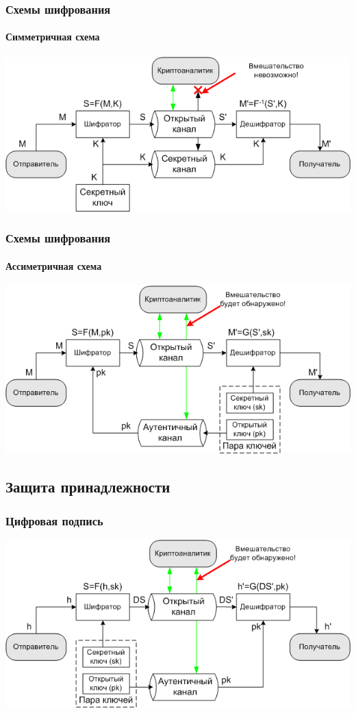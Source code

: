 \begin{frame}
    \frametitle{Схемы шифрования}
    \framesubtitle{Симметричная схема}
    
    \begin{center}
        \includegraphics[width=.95\textwidth]{fig/symmcipher} 
    \end{center}
\end{frame}


\begin{frame}
    \frametitle{Схемы шифрования}
    \framesubtitle{Ассиметричная схема}
    
    \begin{center}
        \includegraphics[width=.95\textwidth]{fig/asymmcipher} 
    \end{center}
\end{frame}


\subsection{Защита принадлежности}


\begin{frame}
    \frametitle{Цифровая подпись}
    
    \begin{center}
        \includegraphics[width=.95\textwidth]{fig/signature} 
    \end{center}
\end{frame}

